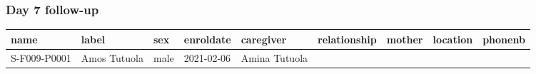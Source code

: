 \documentclass[
]{article}
\begin{document}
\hypertarget{day-7-follow-up}{%
\subsubsection{Day 7 follow-up}\label{day-7-follow-up}}

\begin{longtable}[]{@{}lllllllll@{}}
\toprule
\begin{minipage}[b]{0.07\columnwidth}\raggedright
name\strut
\end{minipage} & \begin{minipage}[b]{0.09\columnwidth}\raggedright
label\strut
\end{minipage} & \begin{minipage}[b]{0.04\columnwidth}\raggedright
sex\strut
\end{minipage} & \begin{minipage}[b]{0.06\columnwidth}\raggedright
enroldate\strut
\end{minipage} & \begin{minipage}[b]{0.09\columnwidth}\raggedright
caregiver\strut
\end{minipage} & \begin{minipage}[b]{0.20\columnwidth}\raggedright
relationship\strut
\end{minipage} & \begin{minipage}[b]{0.07\columnwidth}\raggedright
mother\strut
\end{minipage} & \begin{minipage}[b]{0.07\columnwidth}\raggedright
location\strut
\end{minipage} & \begin{minipage}[b]{0.07\columnwidth}\raggedright
phonenb\strut
\end{minipage}\tabularnewline
\midrule
\endhead
\begin{minipage}[t]{0.07\columnwidth}\raggedright
S-F009-P0001\strut
\end{minipage} & \begin{minipage}[t]{0.09\columnwidth}\raggedright
Amos Tutuola\strut
\end{minipage} & \begin{minipage}[t]{0.04\columnwidth}\raggedright
male\strut
\end{minipage} & \begin{minipage}[t]{0.06\columnwidth}\raggedright
2021-02-06\strut
\end{minipage} & \begin{minipage}[t]{0.09\columnwidth}\raggedright
Amina Tutuola\strut

\end{minipage}
\end{longtable}
\end{document}
